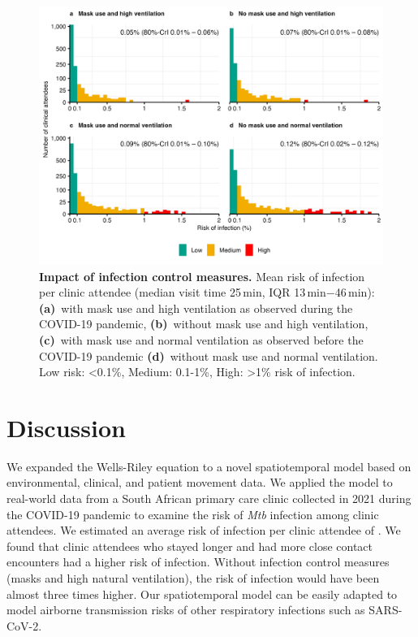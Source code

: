 \documentclass[fleqn,11pt]{wlscirep}
\begin{document}
\begin{figure}
    \centering
    \includegraphics{results/modeling/mean-roi-comparison.png}
    \caption{\textbf{Impact of infection control measures.} Mean risk of infection per clinic attendee (median visit time 25\,min, IQR 13\,min$-$46\,min): \textbf{(a)}~with mask use and high ventilation as observed during the COVID-19 pandemic, \textbf{(b)}~without mask use and high ventilation, \textbf{(c)}~with mask use and normal ventilation as observed before the COVID-19 pandemic  \textbf{(d)}~without mask use and normal ventilation. Low risk: <0.1\%, Medium: 0.1-1\%, High: >1\% risk of infection.}
    \label{fig:scenario-results}
\end{figure}

\FloatBarrier

\newpage

\section*{Discussion}

We expanded the Wells-Riley equation to a novel spatiotemporal model based on environmental, clinical, and patient movement data. We applied the model to real-world data from a South African primary care clinic collected in 2021 during the COVID-19 pandemic to examine the risk of \emph{Mtb} infection among clinic attendees. We estimated an average risk of infection per clinic attendee of . We found that clinic attendees who stayed longer and had more close contact encounters had a higher risk of infection. Without infection control measures (masks and high natural ventilation), the risk of infection would have been almost three times higher. Our spatiotemporal model can be easily adapted to model airborne transmission risks of other respiratory infections such as SARS-CoV-2.
\end{document}
